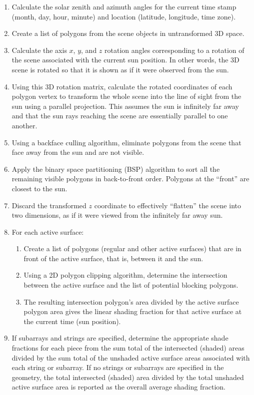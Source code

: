 \documentclass[12pt,letterpaper]{article}
\begin{document}
\begin{enumerate}
\item Calculate the solar zenith and azimuth angles for the current time stamp (month, day, hour, minute) and location (latitude, longitude, time zone).
\item Create a list of polygons from the scene objects in untransformed 3D space.
\item Calculate the axis $x$, $y$, and $z$ rotation angles corresponding to a rotation of the scene associated with the current sun position.  In other words, the 3D scene is rotated so that it is shown as if it were observed from the sun.
\item Using this 3D rotation matrix, calculate the rotated coordinates of each polygon vertex to transform the whole scene into the line of sight from the sun using a parallel projection.  This assumes the sun is infinitely far away and that the sun rays reaching the scene are essentially parallel to one another.
\item Using a backface culling algorithm, eliminate polygons from the scene that face away from the sun and are not visible.
\item Apply the binary space partitioning (BSP) algorithm to sort all the remaining visible polygons in back-to-front order.  Polygons at the ``front'' are closest to the sun.
\item Discard the transformed $z$ coordinate to effectively ``flatten'' the scene into two dimensions, as if it were viewed from the infinitely far away sun.
	\item For each active surface:
	\begin{enumerate}
	\item Create a list of polygons (regular and other active surfaces) that are in front of the active surface, that is, between it and the sun.
	\item Using a 2D polygon clipping algorithm, determine the intersection between the active surface and the list of potential blocking polygons.
	\item The resulting intersection polygon's area divided by the active surface polygon area gives the linear shading fraction for that active surface at the current time (sun position).
	\end{enumerate}
\item If subarrays and strings are specified, determine the appropriate shade fractions for each piece from the sum total of the intersected (shaded) areas divided by the sum total of the unshaded active surface areas associated with each string or subarray.   If no strings or subarrays are specified in the geometry, the total intersected (shaded) area divided by the total unshaded active surface area is reported as the overall average shading fraction.
\end{enumerate}
\end{document}

